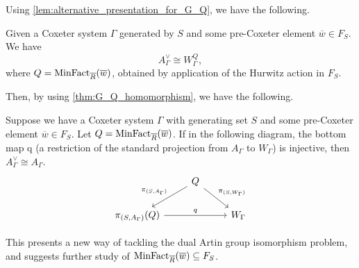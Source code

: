Using \cref{lem:alternative_presentation_for_G_Q}, we have the following.

\begin{lemma}
	Given a Coxeter system $\Gamma$ generated by  $S$ and some pre-Coxeter element $\overline{w} \in F_S$.
	We have
	\[
		A^\vee_\Gamma \cong W_\Gamma^Q
		,\] where  $Q=\operatorname{MinFact}_{\overline{R}}(\overline{w})$, obtained by application of the Hurwitz action in  $F_S$.
\end{lemma}

Then, by using \cref{thm:G_Q_homomorphism}, we have the following.

\begin{proposition}
	Suppose we have a Coxeter system $\Gamma$ with generating set $S$ and some pre-Coxeter element $\overline{w} \in F_S$.
	Let $Q = \operatorname{MinFact}_{\overline{R}}(\overline{w})$.
	If in the following diagram, the bottom map q (a restriction of the standard projection from $A_\Gamma$ to  $W_\Gamma$) is injective, then $A^\vee_\Gamma \cong A_\Gamma$.
	\[
		\begin{tikzcd}
			& Q \ar[dl, "\pi_{(S,A_\Gamma)}"'] \ar[dr, "\pi_{(S,W_\Gamma)}"] & \\
			\pi_{(S,A_\Gamma)}(Q) \ar[rr, "q"] & & W_\Gamma
		\end{tikzcd}
	\]
\end{proposition}

This presents a new way of tackling the dual Artin group isomorphism problem, and suggests further study of $\operatorname{MinFact}_{\overline{R}}(\overline{w}) \subseteq F_S$.
